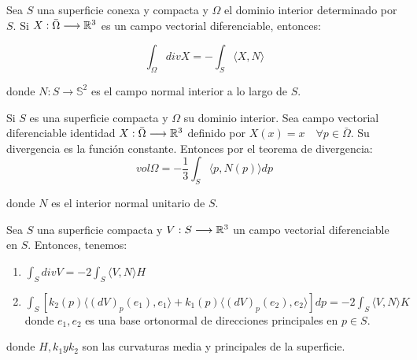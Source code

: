 \begin{theorem}
Sea $S$ una superficie conexa y compacta y $\Omega$ el dominio interior determinado por $S$. Si $X: \bar{\Omega} \longrightarrow \mathbb{R}^3$ es un campo vectorial diferenciable, entonces:

\begin{equation*}
    \int_\Omega div X = -\int_S  \langle X,N \rangle 
\end{equation*}

donde $N: S \longrightarrow \mathbb{S}^2$ es el campo normal interior a lo largo de $S$.
\end{theorem}

\begin{definition}\label{volumensuperficiecompacta}
Si $S$ es una superficie compacta y $\Omega$ su dominio interior. Sea campo vectorial diferenciable identidad $X: \bar{\Omega} \longrightarrow \mathbb{R}^3$ definido por $X(x) = x \quad \forall p \in \bar{\Omega}$. Su divergencia es la función constante. Entonces por el teorema de divergencia:
\begin{equation*}
    vol \Omega = - \frac{1}{3} \int_S  \langle p, N(p) \rangle  dp
\end{equation*}

donde $N$ es el interior normal unitario de $S$.
\end{definition}

\begin{theorem}
Sea $S$ una superficie compacta y $V: S \longrightarrow \mathbb{R}^3$ un campo vectorial diferenciable en $S$. Entonces, tenemos:

\begin{enumerate}
    \item $\int_S div V = -2 \int_S \langle V,N \rangle H$
    \item $\int_S [k_2(p) \langle (dV)_p(e_1),e_1 \rangle  + k_1(p) \langle (dV)_p(e_2),e_2 \rangle ]dp = -2 \int_S \langle V,N \rangle K$ donde ${e_1,e_2}$ es una base ortonormal de direcciones principales en $p \in S$.
\end{enumerate}

donde $H, k_1 y k_2$ son las curvaturas media y principales de la superficie.
\end{theorem}

